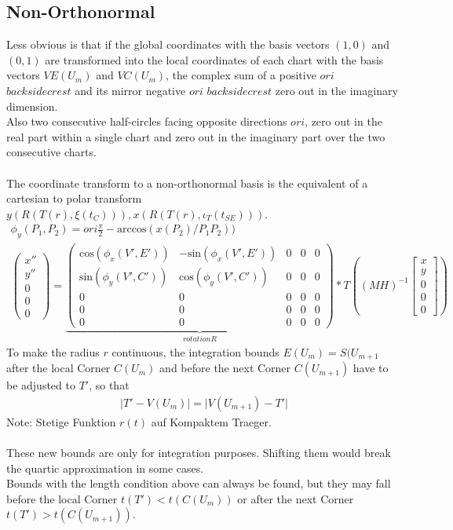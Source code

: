 \documentclass{report}
\begin{document}
\subsection{Non-Orthonormal}
Less obvious is that if the global coordinates with the basis vectors $(1,0)$ and $(0,1)$ are transformed into the local coordinates of each chart with the basis vectors $VE(U_{m})$ and $VC(U_{m})$, the complex sum of a positive $ori$ $backsidecrest$ and its mirror negative $ori$ $backsidecrest$ zero out in the imaginary dimension.\\
Also two consecutive half-circles facing opposite directions $ori$, zero out in the real part within a single chart and zero out in the imaginary part over the two consecutive charts.\\\\
The coordinate transform to a non-orthonormal basis is the equivalent of a cartesian to polar transform $y(R(T(r),\xi(t_{C}))),x(R(T(r),\iota_{T}(t_{SE})))$.
\begin{align}
\phi_{y}(P_{1},P_{2}) = ori\frac{\pi}{2}-\mathrm{arccos}(x(P_{2})/P_{1}P_{2}))\\
\begin{pmatrix}x'' \\ y'' \\ 0 \\ 0 \\ 0\end{pmatrix}=
\underbrace{
\begin{pmatrix}
\mathrm{cos}(\phi_{x}(V',E')) & -\mathrm{sin}(\phi_{x}(V',E')) & 0 & 0 & 0 \\
\mathrm{sin}(\phi_{y}(V',C')) & \mathrm{cos}(\phi_{y}(V',C')) & 0 & 0 & 0 \\
0 & 0 & 0 & 0 & 0 \\
0 & 0 & 0 & 0 & 0 \\
0 & 0 & 0 & 0 & 0
\end{pmatrix}
}_{rotation R}*
T((MH)^{-1}\begin{bmatrix} x \\ y \\ 0 \\ 0 \\ 0 \end{bmatrix})
\end{align}
To make the radius $r$ continuous, the integration bounds $E(U_{m})=S(U_{m+1}$ after the local Corner $C(U_{m})$ and before the next Corner $C(U_{m+1})$ have to be adjusted to $T'$, so that
\begin{align}
\lvert T' - V(U_{m}) \rvert = \lvert V(U_{m+1}) -T' \rvert
\end{align}
Note: Stetige Funktion $r(t)$ auf Kompaktem Traeger.\\\\
These new bounds are only for integration purposes. Shifting them would break the quartic approximation in some cases.\\
Bounds with the length condition above can always be found, but they may fall before the local Corner $t(T') < t(C(U_{m}))$ or after the next Corner $t(T') > t(C(U_{m+1}))$.  
\end{document}
